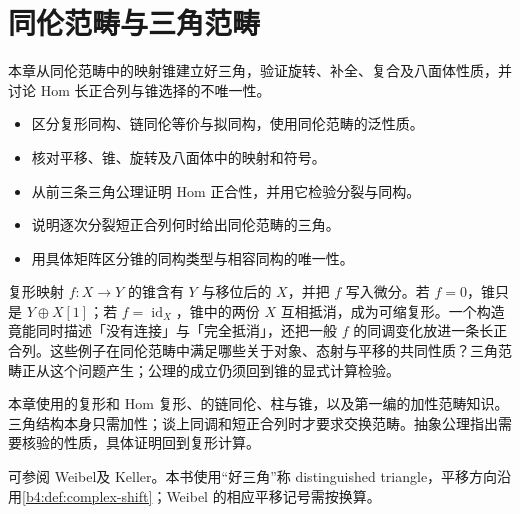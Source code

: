 
\chapter{同伦范畴与三角范畴}
\label{b4:ch:16}

\begin{chapterabstract}
	本章从同伦范畴中的映射锥建立好三角，验证旋转、补全、复合及八面体性质，并讨论 Hom 长正合列与锥选择的不唯一性。
\end{chapterabstract}

\begin{learninggoals}
	\begin{itemize}
		\item 区分复形同构、链同伦等价与拟同构，使用同伦范畴的泛性质。
		\item 核对平移、锥、旋转及八面体中的映射和符号。
		\item 从前三条三角公理证明 Hom 正合性，并用它检验分裂与同构。
		\item 说明逐次分裂短正合列何时给出同伦范畴的三角。
		\item 用具体矩阵区分锥的同构类型与相容同构的唯一性。
	\end{itemize}
\end{learninggoals}

复形映射 \(f:X\rightarrow Y\) 的锥含有 \(Y\) 与移位后的 \(X\)，并把 \(f\) 写入微分。若 \(f=0\)，锥只是 \(Y\oplus X[1]\)；若 \(f=\operatorname{id}_X\)，锥中的两份 \(X\) 互相抵消，成为可缩复形。一个构造竟能同时描述「没有连接」与「完全抵消」，还把一般 \(f\) 的同调变化放进一条长正合列。这些例子在同伦范畴中满足哪些关于对象、态射与平移的共同性质？三角范畴正从这个问题产生；公理的成立仍须回到锥的显式计算检验。

\ProseParagraphBreak
本章使用的复形和 Hom 复形、的链同伦、柱与锥，以及第一编的加性范畴知识。三角结构本身只需加性；谈上同调和短正合列时才要求交换范畴。抽象公理指出需要核验的性质，具体证明回到复形计算。

\ProseParagraphBreak
可参阅 Weibel\cite[Definitions 10.1.3 and 10.2.1; Proposition 10.2.4; Example 10.2.8]{Weibel1994HomologicalAlgebra}及 Keller\cite[Section 3.1]{Keller1998AbelianDerived}。本书使用“好三角”称 distinguished triangle，平移方向沿用\cref{b4:def:complex-shift}；Weibel 的相应平移记号需按换算。






